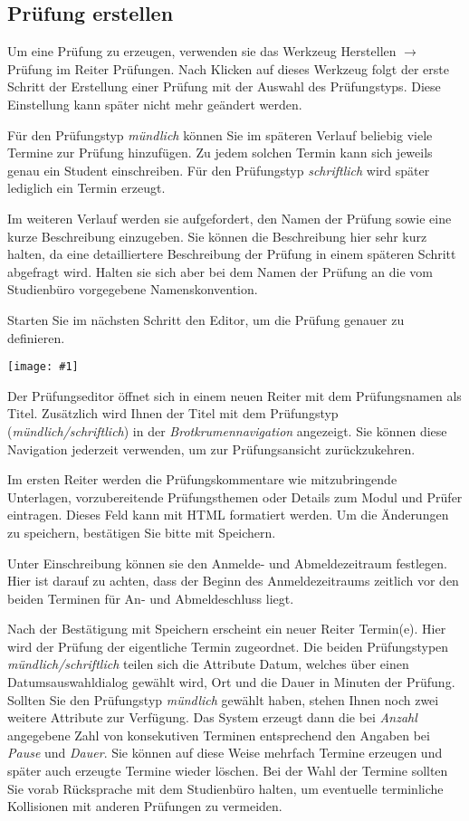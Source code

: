 \documentclass[a4paper,11pt]{article}
\newcommand{\bild}[1]{
    \begin{center}\texttt{[image: \#1]}\end{center}
}
\newcommand{\knopf}[1]{{\sc #1}}
\begin{document}
\subsection{Prüfung erstellen}

Um eine Prüfung zu erzeugen, verwenden sie das Werkzeug \knopf{Herstellen $\rightarrow$ 
Prüfung} im Reiter \knopf{Prüfungen}. Nach Klicken auf dieses Werkzeug
folgt der erste Schritt der Erstellung einer Prüfung mit der Auswahl des
Prüfungstyps. Diese Einstellung kann später nicht mehr geändert werden.

Für den Prüfungstyp {\em mündlich} können Sie im späteren Verlauf beliebig
viele Termine zur Prüfung hinzufügen. Zu jedem solchen Termin kann sich
jeweils genau ein Student einschreiben. Für den Prüfungstyp {\em schriftlich}
wird später lediglich ein Termin erzeugt.

Im weiteren Verlauf werden sie aufgefordert, den Namen der Prüfung sowie eine kurze
Beschreibung einzugeben. Sie können die Beschreibung hier sehr kurz halten, da
eine detailliertere Beschreibung der Prüfung in einem späteren Schritt
abgefragt wird. Halten sie sich aber bei dem Namen der Prüfung an die vom
Studienbüro vorgegebene Namenskonvention. 

Starten Sie im nächsten Schritt den Editor, um die Prüfung genauer zu
definieren.

\bild{exam-edit}

Der Prüfungseditor öffnet sich in einem neuen Reiter mit
dem Prüfungsnamen als Titel. Zusätzlich wird Ihnen der Titel mit dem Prüfungstyp
({\em mündlich/schriftlich}) in der {\em Brotkrumennavigation}
angezeigt. Sie können diese Navigation jederzeit verwenden, um zur Prüfungsansicht
zurückzukehren. 

Im ersten Reiter werden die Prüfungskommentare wie mitzubringende
Unterlagen, vorzubereitende Prüfungsthemen oder Details zum Modul und Prüfer eintragen.
Dieses Feld kann mit HTML formatiert werden.
Um die Änderungen zu speichern, bestätigen Sie bitte mit \knopf{Speichern}.

Unter \knopf{Einschreibung} können sie den Anmelde- und Abmeldezeitraum
festlegen. Hier ist darauf zu achten, dass der Beginn des Anmeldezeitraums
zeitlich vor den beiden Terminen für An- und Abmeldeschluss liegt.

Nach der Bestätigung mit \knopf{Speichern} erscheint ein neuer Reiter
\knopf{Termin(e)}. Hier wird der Prüfung der eigentliche Termin zugeordnet.
Die beiden Prüfungstypen {\em mündlich/schriftlich} teilen sich die Attribute
Datum, welches über einen Datumsauswahldialog gewählt wird, Ort und die Dauer
in Minuten der Prüfung. Sollten Sie den Prüfungstyp {\em mündlich} gewählt
haben, stehen Ihnen noch zwei weitere Attribute zur Verfügung. Das System
erzeugt dann die bei {\em Anzahl} angegebene Zahl von konsekutiven Terminen
entsprechend den Angaben bei {\em Pause} und {\em Dauer}.  Sie können auf
diese Weise mehrfach Termine erzeugen und später auch erzeugte Termine wieder
löschen. Bei der Wahl der Termine sollten Sie vorab Rücksprache mit
dem Studienbüro halten, um eventuelle terminliche Kollisionen mit anderen
Prüfungen zu vermeiden.
\end{document}
